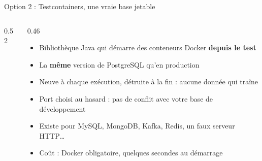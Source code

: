 \documentclass[aspectratio=169,10pt]{beamer}
\begin{document}
\begin{frame}{Option 2 : Testcontainers, une vraie base jetable}
  \begin{columns}[c]
    \begin{column}{0.52\textwidth}
      \begin{center}
      \end{center}
    \end{column}
    \begin{column}{0.46\textwidth}
      \begin{itemize}
        \item Bibliothèque Java qui démarre des conteneurs Docker \textbf{depuis le test}
        \item La \textbf{même} version de PostgreSQL qu'en production
        \item Neuve à chaque exécution, détruite à la fin : aucune donnée qui traîne
        \item Port choisi au hasard : pas de conflit avec votre base de développement
        \item Existe pour MySQL, MongoDB, Kafka, Redis, un faux serveur HTTP\ldots
        \item Coût : Docker obligatoire, quelques secondes au démarrage
      \end{itemize}
    \end{column}
  \end{columns}
\end{frame}
\end{document}
